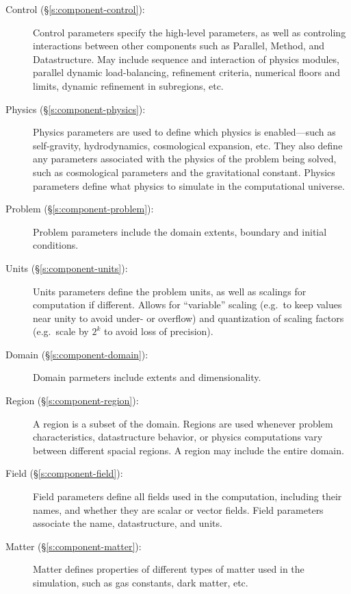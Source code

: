\begin{description}

 \item [Control (\S\ref{s:component-control}): ] Control parameters specify the
 high-level parameters, as well as controling interactions between
 other components such as Parallel, Method, and Datastructure.  May
 include sequence and interaction of physics modules, parallel dynamic
 load-balancing, refinement criteria, numerical floors and limits,
 dynamic refinement in subregions, etc.

 \item [Physics (\S\ref{s:component-physics}): ] Physics parameters are used to
 define which physics is enabled---such as self-gravity,
 hydrodynamics, cosmological expansion, etc.  They also define any
 parameters associated with the physics of the problem being solved,
 such as cosmological parameters and the gravitational constant.
 Physics parameters define what physics to simulate in the
 computational universe.

 \item [Problem (\S\ref{s:component-problem}): ] Problem parameters include
 the domain extents, boundary and initial conditions.

 \item [Units (\S\ref{s:component-units}): ] Units parameters define the problem
 units, as well as scalings for computation if different.  Allows for
 ``variable'' scaling (e.g.~to keep values near unity to avoid under-
 or overflow) and quantization of scaling factors (e.g.~scale by $2^k$
 to avoid loss of precision).

 \item [Domain (\S\ref{s:component-domain}): ] Domain parmeters include extents
 and dimensionality.

 \item [Region (\S\ref{s:component-region}): ] A region is a subset of the
 domain.  Regions are used whenever problem characteristics,
 datastructure behavior, or physics computations vary between
 different spacial regions.  A region may include the entire
 domain.

 \item [Field (\S\ref{s:component-field}): ] Field parameters define all fields
 used in the computation, including their names, and whether they are
 scalar or vector fields.  Field parameters associate the name,
 datastructure, and units.

 \item [Matter (\S\ref{s:component-matter}): ] Matter defines properties of
 different types of matter used in the simulation, such as gas
 constants, dark matter, etc.


\end{description}
